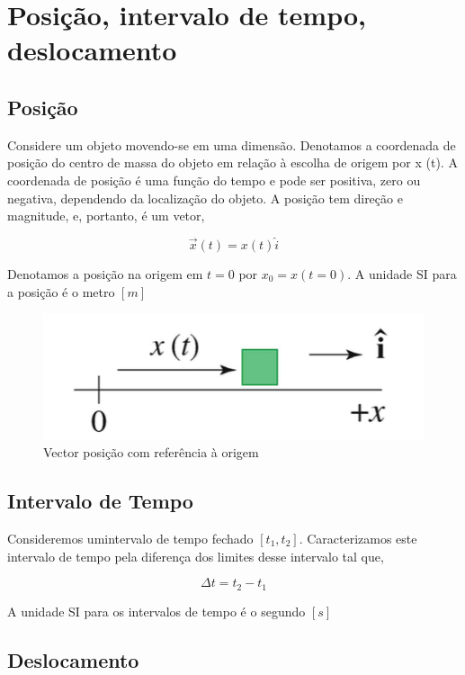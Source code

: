 \documentclass[
  portuguese,
  ]{book}
\begin{document}
\hypertarget{posiuxe7uxe3o-intervalo-de-tempo-deslocamento}{%
\section{Posição, intervalo de tempo, deslocamento}\label{posiuxe7uxe3o-intervalo-de-tempo-deslocamento}}

\hypertarget{posiuxe7uxe3o}{%
\subsection{Posição}\label{posiuxe7uxe3o}}

Considere um objeto movendo-se em uma dimensão. Denotamos a coordenada de posição do centro de massa do objeto em relação à escolha de origem por x (t). A coordenada de posição é uma função do tempo e pode ser positiva, zero ou negativa, dependendo da localização do objeto. A posição tem direção e magnitude, e, portanto, é um vetor,

\[
\vec{x}(t)=x(t)\widehat{i}
\]

Denotamos a posição na origem em \(t=0\) por \(x_0=x(t=0)\). A unidade SI para a posição é o metro \([m]\)

\begin{figure}

{\centering \includegraphics[width=0.4\linewidth]{img/2} 

}

\caption{Vector posição com referência à origem}\label{fig:img2}
\end{figure}

\hypertarget{intervalo-de-tempo}{%
\subsection{Intervalo de Tempo}\label{intervalo-de-tempo}}

Consideremos umintervalo de tempo fechado \([t_1,t_2]\). Caracterizamos este intervalo de tempo pela diferença dos limites desse intervalo tal que,

\[\Delta t=t_2-t_1\]

A unidade SI para os intervalos de tempo é o segundo \([s]\)

\hypertarget{deslocamento}{%
\subsection{Deslocamento}\label{deslocamento}}
\end{document}
